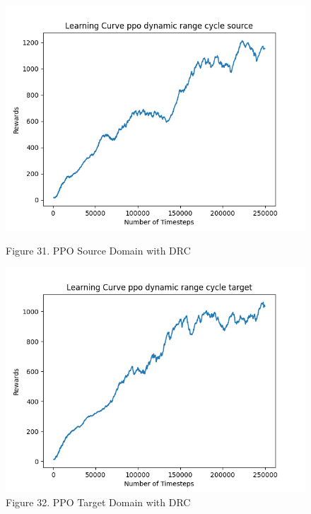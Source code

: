 \documentclass[12pt]{article}
\begin{document}
\begin{figure}[H]
    \vfill
    \begin{minipage}{0.45\textwidth}
        \centering
        \includegraphics[width=\textwidth]{../images/Learning_Curve_PPO_DRC_Source.png}
        \caption{Figure 31. PPO Source Domain with DRC}
        \label{fig:ppo_source_drc}
    \end{minipage}
    \hfill
    \begin{minipage}{0.45\textwidth}
        \centering
        \includegraphics[width=\textwidth]{../images/Learning_Curve_PPO_DRC_Target.png}
        \caption{Figure 32. PPO Target Domain with DRC}
        \label{fig:ppo_target_drc}
    \end{minipage}
\end{figure}
\end{document}
